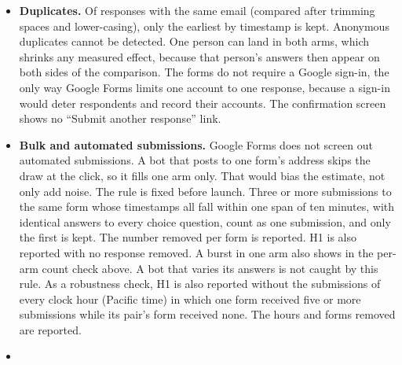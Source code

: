 \begin{itemize}
  If the checks show differential attrition, H1 is reported as registered and also with the
  trimming bounds of Lee (2009). Differential attrition means that, within an entry point, the
  two arms' submissions per draw differ at the 5\% level in a two-sided test of two proportions,
  or, when the count fails, that the exact binomial test of item 1 rejects at the 5\% level.
  Within each entry point, the arm with the higher submission rate \(q_H\) is trimmed by the share
  \((q_H - q_L)/q_H\) of its responses, where \(q_L\) is the other arm's rate. It is trimmed once
  from the top and once from the bottom of its lean-index distribution. The two trimmed estimates
  of the H1 equation bound the effect among respondents who would have submitted in either arm.
  When the count fails, the submission counts stand in for the rates, since the draw is even in
  expectation. The bounds are reported without a test when an arm has fewer than 50 responses in
  the entry point.
\item
  \textbf{Duplicates.} Of responses with the same email (compared after trimming spaces and
  lower-casing), only the earliest by timestamp is kept. Anonymous duplicates cannot be detected.
  One person can land in both arms, which shrinks any measured effect, because that person's
  answers then appear on both sides of the comparison. The forms do not require a Google sign-in,
  the only way Google Forms limits one account to one response, because a sign-in would deter
  respondents and record their accounts. The confirmation screen shows no ``Submit another
  response'' link.
\item
  \textbf{Bulk and automated submissions.} Google Forms does not screen out automated submissions. A
  bot that posts to one form's address skips the draw at the click, so it fills one arm only. That
  would bias the estimate, not only add noise. The rule is fixed before launch. Three or more
  submissions to the same form whose timestamps all fall within one span of ten minutes, with
  identical answers to every choice question, count as one submission, and only the first is kept. The number removed per form is
  reported. H1 is also reported with no response removed. A burst in one arm also shows in the
  per-arm count check above.
  A bot that varies its answers is not caught by this rule. As a robustness check, H1 is also
  reported without the submissions of every clock hour (Pacific time) in which one form received
  five or more submissions while its pair's form received none. The hours and forms removed are
  reported.
\item

\end{itemize}
